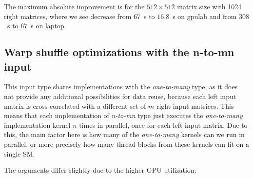 The maximum absolute improvement is for the $512 \times 512$ matrix size with 1024 right matrices, where we see decrease from $67$~s to $16.8$~s on gpulab and from $308$~s to $67$~s on laptop.

\subsection{Warp shuffle optimizations with the n-to-mn input}
This input type shares implementations with the \textit{one-to-many} type, as it does not provide any additional possibilities for data reuse, because each left input matrix is cross-correlated with a different set of $m$ right input matrices. This means that each implementation of \textit{n-to-mn} type just executes the \textit{one-to-many} implementation kernel $n$ times in parallel, once for each left input matrix. Due to this, the main factor here is how many of the \textit{one-to-many} kernels can we run in parallel, or more precisely how many thread blocks from these kernels can fit on a single SM.

The arguments differ slightly due to the higher GPU utilization:

